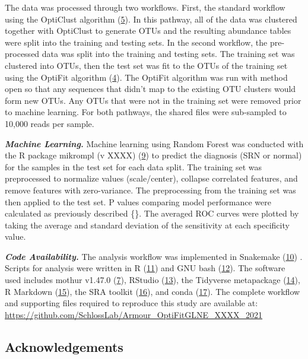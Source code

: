 \documentclass[
]{article}
\begin{document}
The data was processed through two workflows. First, the standard
workflow using the OptiClust algorithm
(\protect\hyperlink{ref-westcott2017}{5}). In this pathway, all of the
data was clustered together with OptiClust to generate OTUs and the
resulting abundance tables were split into the training and testing
sets. In the second workflow, the pre-processed data was split into the
training and testing sets. The training set was clustered into OTUs,
then the test set was fit to the OTUs of the training set using the
OptiFit algorithm (\protect\hyperlink{ref-sovacool2022}{4}). The OptiFit
algorithm was run with method open so that any sequences that didn't map
to the existing OTU clusters would form new OTUs. Any OTUs that were not
in the training set were removed prior to machine learning. For both
pathways, the shared files were sub-sampled to 10,000 reads per sample.

\textbf{\emph{Machine Learning.}} Machine learning using Random Forest
was conducted with the R package mikrompl (v XXXX)
(\protect\hyperlink{ref-topuxe7uoglu2021}{9}) to predict the diagnosis
(SRN or normal) for the samples in the test set for each data split. The
training set was preprocessed to normalize values (scale/center),
collapse correlated features, and remove features with zero-variance.
The preprocessing from the training set was then applied to the test
set. P values comparing model performance were calculated as previously
described \{\}. The averaged ROC curves were plotted by taking the
average and standard deviation of the sensitivity at each specificity
value.

\textbf{\emph{Code Availability.}} The analysis workflow was implemented
in Snakemake (\protect\hyperlink{ref-koster2012}{10}) . Scripts for
analysis were written in R (\protect\hyperlink{ref-R2020}{11}) and GNU
bash (\protect\hyperlink{ref-GNUbash}{12}). The software used includes
mothur v1.47.0 (\protect\hyperlink{ref-schloss2009}{7}), RStudio
(\protect\hyperlink{ref-RStudio2019}{13}), the Tidyverse metapackage
(\protect\hyperlink{ref-wickham2019}{14}), R Markdown
(\protect\hyperlink{ref-xie_r_2018}{15}), the SRA toolkit
(\protect\hyperlink{ref-noauthor_sra-tools_nodate}{16}), and conda
(\protect\hyperlink{ref-noauthor_anaconda_2016}{17}). The complete
workflow and supporting files required to reproduce this study are
available at:
\url{https://github.com/SchlossLab/Armour_OptiFitGLNE_XXXX_2021}

\hypertarget{acknowledgements}{%
\subsection{Acknowledgements}\label{acknowledgements}}
\end{document}

